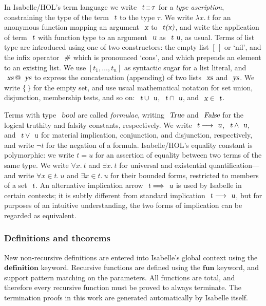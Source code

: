 In Isabelle/HOL's term language we write $\isa{t} \mathbin{::} \tau$ for a \emph{type ascription}, constraining the type of the term $\isa{t}$ to the type $\tau$.
We write $\lambda{x}.\: t$ for an anonymous function mapping an argument $\isa{x}$ to $\isa{t(x)}$, and write the application of term $\isa{t}$ with function type to an argument $\isa{u}$ as $\isa{t\ u}$, as usual.
Terms of list type are introduced using one of two constructors: the empty list $[\,]$ or `nil', and the infix operator $\isa{\#}$ which is pronounced `cons', and which prepends an element to an existing list.
We use $[t_1, \ldots, t_n]$ as syntactic sugar for a list literal, and $\isa{xs} \mathbin{\isacharat} \isa{ys}$ to express the concatenation (appending) of two lists $\isa{xs}$ and $\isa{ys}$.
We write $\{\,\}$ for the empty set, and use usual mathematical notation for set union, disjunction, membership tests, and so on: $\isa{t} \cup \isa{u}$, $\isa{t} \cap \isa{u}$, and $\isa{x} \in \isa{t}$.

Terms with type $\isa{bool}$ are called \emph{formulae}, writing $\isa{True}$ and $\isa{False}$ for the logical truthity and falsity constants, respectively.
We write $\isa{t} \longrightarrow \isa{u}$, $\isa{t} \wedge \isa{u}$, and $\isa{t} \vee \isa{u}$ for material implication, conjunction, and disjunction, respectively, and write $\neg t$ for the negation of a formula.
Isabelle/HOL's equality constant is polymorphic: we write $t = u$ for an assertion of equality between two terms of the same type.
We write $\forall{x}.\: t$ and $\exists{x}.\: t$ for universal and existential quantification---and write $\forall{x{\in}t}.\: u$ and $\exists{x{\in}t}.\: u$ for their bounded forms, restricted to members of a set $\isa{t}$.
An alternative implication arrow $\isa{t} \Longrightarrow \isa{u}$ is used by Isabelle in certain contexts; it is subtly different from standard implication $\isa{t} \longrightarrow \isa{u}$, but for purposes of an intuitive understanding, the two forms of implication can be regarded as equivalent.

\subsubsection{Definitions and theorems}\label{sect.isabelle.definitions}

New non-recursive definitions are entered into Isabelle's global context using the $\mathbf{definition}$ keyword.
Recursive functions are defined using the $\mathbf{fun}$ keyword, and support pattern matching on the parameters.
All functions are total, and therefore every recursive function must be proved to always terminate.
The termination proofs in this work are generated automatically by Isabelle itself.

